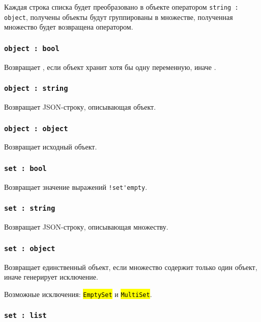 \documentclass[a4paper, 14pt]{extarticle}
\newcommand{\ferror}[1]{{\fontsize{11pt}{12pt}\tt{\sethlcolor{yellow}\hl{#1}}}}
\begin{document}
Каждая строка списка будет преобразовано в объекте оператором \lstinline|string : object|, получены объекты будут группированы в множестве, полученная множество будет возвращена оператором.

\subsubsection{\lstinline|object : bool|}

Возвращает \true, если объект хранит хотя бы одну переменную, иначе \false.

\subsubsection{\lstinline|object : string|}

Возвращает JSON-строку, описывающая объект.

\subsubsection{\lstinline|object : object|}

Возвращает исходный объект.

\subsubsection{\lstinline|set : bool|}

Возвращает значение выражений \lstinline|!set'empty|.

\subsubsection{\lstinline|set : string|}

Возвращает JSON-строку, описывающая множеству.

\subsubsection{\lstinline|set : object|}

Возвращает единственный объект, если множество содержит только один объект, иначе генерирует исключение.

Возможные исключения: \ferror{EmptySet} и \ferror{MultiSet}.

\subsubsection{\lstinline|set : list|}
\end{document}
